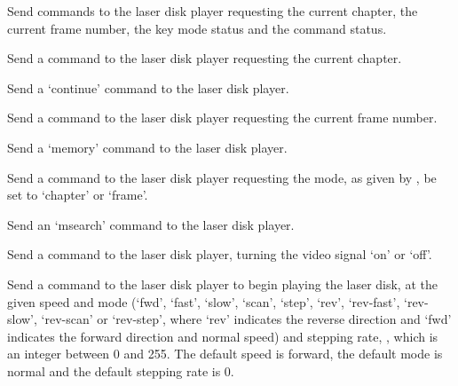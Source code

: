   
  
  
  
  
  
  
  
  \objListIOEnd






\objItemCommands[]

  \objListCmdBegin
  
  Send commands to the laser disk player requesting the current chapter, the current frame number,
  the key mode status and the command status.
  
  Send a command to the laser disk player requesting the current chapter.
  
  Send a `continue' command to the laser disk player.
  
  Send a command to the laser disk player requesting the current frame number.
  
  Send a `memory' command to the laser disk player.
  
  Send a command to the laser disk player requesting the mode, as given by , be
  set to `chapter' or `frame'.
  
  Send an `msearch' command to the laser disk player.
  
  Send a command to the laser disk player, turning the video signal `on' or `off'.
  
  Send a command to the laser disk player to begin playing the laser disk, at the given speed and
  mode (`fwd', `fast', `slow', `scan', `step', `rev', `rev-fast', `rev-slow', `rev-scan' or
  `rev-step', where `rev' indicates the reverse direction and `fwd' indicates the forward direction
  and normal speed) and stepping rate, , which is an integer between 0 and 255.
  The default speed is forward, the default mode is normal and the default stepping rate is 0.
  
